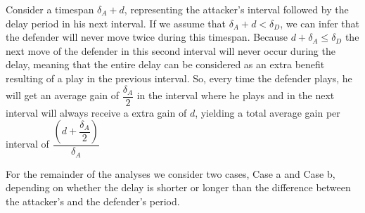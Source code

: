 Consider a timespan $\delta_{A} + d$, representing the attacker's interval followed by the delay period in his next interval. If we assume that $\delta_{A}+d<\delta_{D}$, we can infer that the defender will never move twice during this timespan.
Because $d + \delta_{A} \leq \delta_{D}$ the next move of the defender in this second interval will never occur during the delay, meaning that the entire delay can be considered as an extra benefit resulting of a play in the previous interval. 
So, every time the defender plays, he will get an average gain of $\dfrac{\delta_{A}}{2}$ in the interval where he plays and in the next interval will always receive a extra gain of $d$, yielding a total average gain per interval of
$\dfrac{(d+\dfrac{\delta_{A}}{2})}{\delta_{A}}$

For the remainder of the analyses we consider two cases, Case a and Case b, depending on whether the delay is shorter or longer than the difference between the attacker's and the defender's period.  \\

